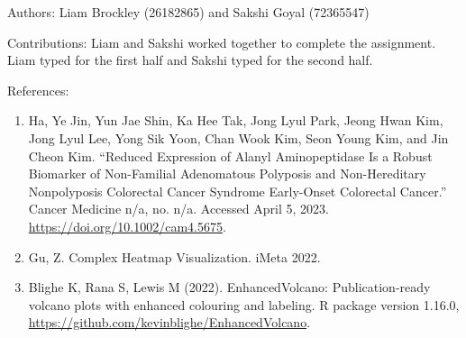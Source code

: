 \documentclass[
]{article}
\begin{document}
Authors: Liam Brockley (26182865) and Sakshi Goyal (72365547)

Contributions: Liam and Sakshi worked together to complete the
assignment. Liam typed for the first half and Sakshi typed for the
second half.

References:

\begin{enumerate}
\def\labelenumi{\arabic{enumi}.}
\item
  Ha, Ye Jin, Yun Jae Shin, Ka Hee Tak, Jong Lyul Park, Jeong Hwan Kim,
  Jong Lyul Lee, Yong Sik Yoon, Chan Wook Kim, Seon Young Kim, and Jin
  Cheon Kim. ``Reduced Expression of Alanyl Aminopeptidase Is a Robust
  Biomarker of Non-Familial Adenomatous Polyposis and Non-Hereditary
  Nonpolyposis Colorectal Cancer Syndrome Early-Onset Colorectal
  Cancer.'' Cancer Medicine n/a, no. n/a. Accessed April 5, 2023.
  \url{https://doi.org/10.1002/cam4.5675}.
\item
  Gu, Z. Complex Heatmap Visualization. iMeta 2022.
\item
  Blighe K, Rana S, Lewis M (2022). EnhancedVolcano: Publication-ready
  volcano plots with enhanced colouring and labeling. R package version
  1.16.0, \url{https://github.com/kevinblighe/EnhancedVolcano}.
\end{enumerate}
\end{document}
